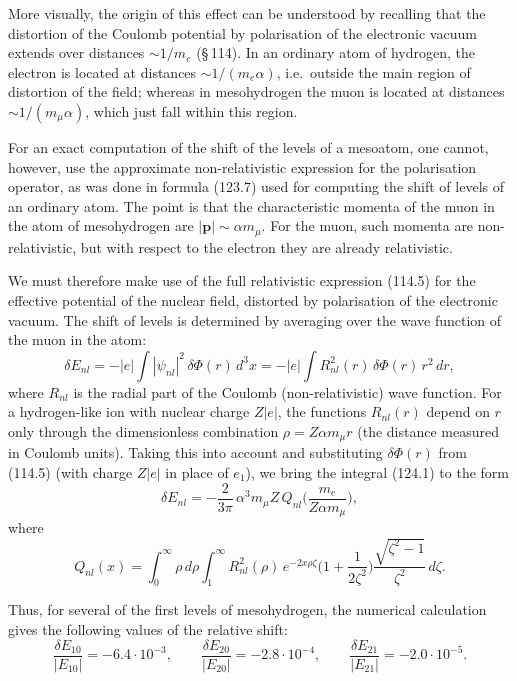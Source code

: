 More visually, the origin of this effect can be understood by recalling that the distortion of the Coulomb potential by polarisation of the electronic vacuum extends over distances $\sim 1/m_e$ (\S\,114). In an ordinary atom of hydrogen, the electron is located at distances $\sim 1/(m_e\alpha)$, i.e.\ outside the main region of distortion of the field; whereas in mesohydrogen the muon is located at distances $\sim 1/(m_\mu\alpha)$, which just fall within this region.

For an exact computation of the shift of the levels of a mesoatom, one cannot, however, use the approximate non-relativistic expression for the polarisation operator, as was done in formula (123.7) used for computing the shift of levels of an ordinary atom. The point is that the characteristic momenta of the muon in the atom of mesohydrogen are $|\mathbf{p}| \sim \alpha m_\mu$. For the muon, such momenta are non-relativistic, but with respect to the electron they are already relativistic.

We must therefore make use of the full relativistic expression (114.5) for the effective potential of the nuclear field, distorted by polarisation of the electronic vacuum. The shift of levels is determined by averaging over the wave function of the muon in the atom:
\begin{equation}
\delta E_{nl} = -|e|\int|\psi_{nl}|^2\,\delta\Phi(r)\,d^3x = -|e|\int R_{nl}^2(r)\,\delta\Phi(r)\,r^2\,dr,
\label{eq:124.1}
\end{equation}
where $R_{nl}$ is the radial part of the Coulomb (non-relativistic) wave function. For a hydrogen-like ion with nuclear charge $Z|e|$, the functions $R_{nl}(r)$ depend on $r$ only through the dimensionless combination $\rho = Z\alpha m_\mu r$ (the distance measured in Coulomb units). Taking this into account and substituting $\delta\Phi(r)$ from (114.5) (with charge $Z|e|$ in place of $e_1$), we bring the integral (124.1) to the form
\begin{equation}
\delta E_{nl} = -\frac{2}{3\pi}\,\alpha^3 m_\mu Z\, Q_{nl}\!\biggl(\frac{m_e}{Z\alpha m_\mu}\biggr),
\label{eq:124.2}
\end{equation}
where
\[
Q_{nl}(x) = \int_0^\infty \rho\,d\rho \int_1^\infty R_{nl}^2(\rho)\,e^{-2x\rho\zeta}\biggl(1 + \frac{1}{2\zeta^2}\biggr)\frac{\sqrt{\zeta^2 - 1}}{\zeta^2}\,d\zeta.
\]


Thus, for several of the first levels of mesohydrogen, the numerical calculation gives the following values of the relative shift:
\[
\frac{\delta E_{10}}{|E_{10}|} = -6.4\cdot 10^{-3},\qquad \frac{\delta E_{20}}{|E_{20}|} = -2.8\cdot 10^{-4},\qquad \frac{\delta E_{21}}{|E_{21}|} = -2.0\cdot 10^{-5}.
\]
